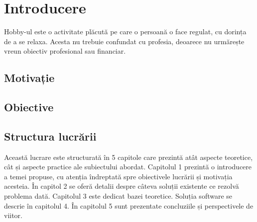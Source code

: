 \chapter{Introducere}
\label{intro}

Hobby-ul este o activitate plăcută pe care o persoană o face regulat, cu dorința de a se relaxa. Acesta nu trebuie confundat cu profesia, deoarece nu urmărește vreun obiectiv profesional sau financiar.

\section{Motivație}
\label{section:ch1sec1}


\section{Obiective}
\label{section:ch1sec2}


\section{Structura lucrării}
\label{section:ch1sec3}

Această lucrare este structurată în 5 capitole care prezintă atât aspecte teoretice, cât și aspecte practice ale subiectului abordat. Capitolul 1 prezintă o introducere a temei propuse, cu atenția îndreptată spre obiectivele lucrării și motivația acesteia. În capitol 2 se oferă detalii despre câteva soluții existente ce rezolvă problema dată. Capitolul 3 este dedicat bazei teoretice. Soluția software se descrie în capitolul 4. În capitolul 5 sunt prezentate concluziile și perspectivele de viitor.